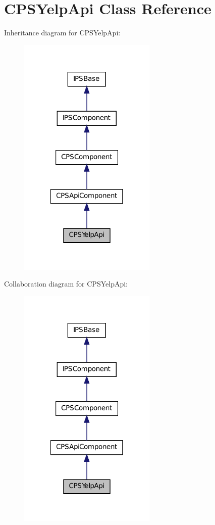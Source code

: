 \hypertarget{classCPSYelpApi}{
\section{CPSYelpApi Class Reference}
\label{classCPSYelpApi}
}


Inheritance diagram for CPSYelpApi:\nopagebreak
\begin{figure}[H]
\begin{center}
\leavevmode
\includegraphics[width=186pt]{classCPSYelpApi__inherit__graph}
\end{center}
\end{figure}


Collaboration diagram for CPSYelpApi:\nopagebreak
\begin{figure}[H]
\begin{center}
\leavevmode
\includegraphics[width=186pt]{classCPSYelpApi__coll__graph}
\end{center}
\end{figure}
